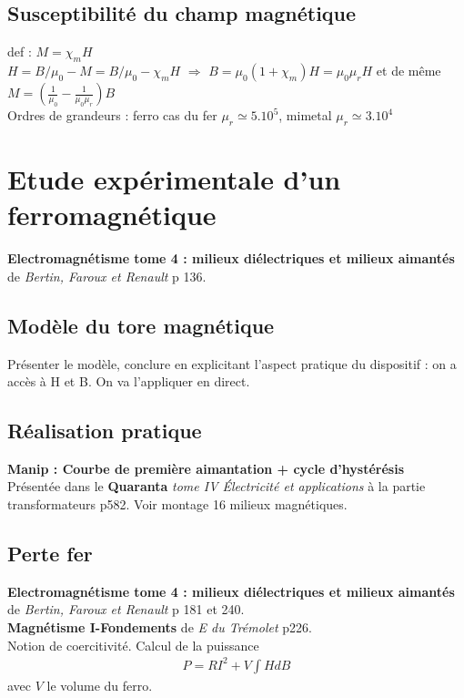 \documentclass[12pt,prb,aps,epsf]{article}
\begin{document}
 \subsection{Susceptibilité du champ magnétique}
def : $M=\chi_m H$\\
$H = B/\mu_0 - M = B/\mu_0 - \chi_m H$ $\Rightarrow$ $B = \mu_0(1+\chi_m)H = \mu_0\mu_r H$ et de même $M = (\frac{1}{\mu_0}-\frac{1}{\mu_0\mu_r})B$\\
Ordres de grandeurs : ferro cas du fer $\mu_r \simeq 5.10^5$, mimetal $\mu_r \simeq 3.10^4$ 

\section{Etude expérimentale d'un ferromagnétique}
\textbf{Electromagnétisme tome 4 : milieux diélectriques et milieux aimantés} de \textit{Bertin, Faroux et Renault} p 136.

\subsection{Modèle du tore magnétique}
Présenter le modèle, conclure en explicitant l'aspect pratique du dispositif : on a accès à H et B. On va l'appliquer en direct.

\subsection{Réalisation pratique}
\textbf{Manip : Courbe de première aimantation + cycle d'hystérésis}\\
Présentée dans le \textbf{Quaranta} \textit{tome IV Électricité et applications} à la partie transformateurs p582. Voir montage 16 milieux magnétiques.

\subsection{Perte fer}
\textbf{Electromagnétisme tome 4 : milieux diélectriques et milieux aimantés} de \textit{Bertin, Faroux et Renault} p 181 et 240.\\
\textbf{Magnétisme I-Fondements} de \textit{E du Trémolet} p226.\\

Notion de coercitivité. Calcul de la puissance
\begin{eqnarray}
P = RI^2 + V\int HdB
\end{eqnarray}
avec $V$ le volume du ferro.\\
\end{document}

